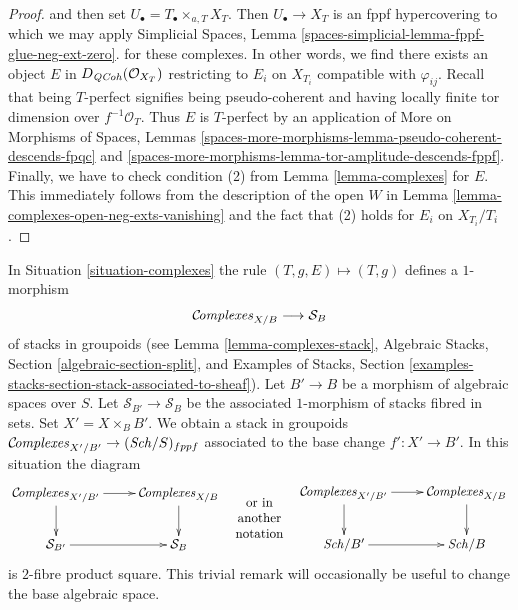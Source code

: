 \begin{proof}
{and then set $U_\bullet = T_\bullet \times_{a, T} X_T$. Then
$U_\bullet \to X_T$ is an fppf hypercovering to which we may
apply Simplicial Spaces, Lemma
\ref{spaces-simplicial-lemma-fppf-glue-neg-ext-zero}.}
for these complexes. In other words, we find there exists an object
$E$ in $D_{\mathit{QCoh}}(\mathcal{O}_{X_T})$ restricting to $E_i$ on $X_{T_i}$
compatible with $\varphi_{ij}$. Recall that being
$T$-perfect signifies being pseudo-coherent and having
locally finite tor dimension over $f^{-1}\mathcal{O}_T$.
Thus $E$ is $T$-perfect by an application of
More on Morphisms of Spaces, Lemmas
\ref{spaces-more-morphisms-lemma-pseudo-coherent-descends-fpqc} and
\ref{spaces-more-morphisms-lemma-tor-amplitude-descends-fppf}.
Finally, we have to check condition (2) from
Lemma \ref{lemma-complexes} for $E$.
This immediately follows from the description of the open $W$
in Lemma \ref{lemma-complexes-open-neg-exts-vanishing}
and the fact that (2) holds for $E_i$ on $X_{T_i}/T_i$.
\end{proof}

\begin{remark}
\label{remark-complexes-base-change}
In Situation \ref{situation-complexes} the rule
$(T, g, E) \mapsto (T, g)$ defines a $1$-morphism
$$
\mathcal{C}\!\mathit{omplexes}_{X/B} \longrightarrow \mathcal{S}_B
$$
of stacks in groupoids
(see Lemma \ref{lemma-complexes-stack},
Algebraic Stacks, Section \ref{algebraic-section-split}, and
Examples of Stacks, Section
\ref{examples-stacks-section-stack-associated-to-sheaf}).
Let $B' \to B$ be a morphism of
algebraic spaces over $S$. Let $\mathcal{S}_{B'} \to \mathcal{S}_B$
be the associated $1$-morphism of stacks fibred in sets.
Set $X' = X \times_B B'$.
We obtain a stack in groupoids
$\mathcal{C}\!\mathit{omplexes}_{X'/B'} \to (\mathit{Sch}/S)_{fppf}$
associated to the base change $f' : X' \to B'$. In this situation
the diagram
$$
\vcenter{
\xymatrix{
\Complexesstack_{X'/B'} \ar[r] \ar[d] &
\Complexesstack_{X/B} \ar[d] \\
\mathcal{S}_{B'} \ar[r] & \mathcal{S}_B
}
}
\quad
\begin{matrix}
\text{or in} \\
\text{another} \\
\text{notation}
\end{matrix}
\quad
\vcenter{
\xymatrix{
\Complexesstack_{X'/B'} \ar[r] \ar[d] &
\Complexesstack_{X/B} \ar[d] \\
\Sch/B' \ar[r] & \Sch/B
}
}
$$
is $2$-fibre product square. This trivial remark
will occasionally be useful to change the base algebraic space.
\end{remark}

